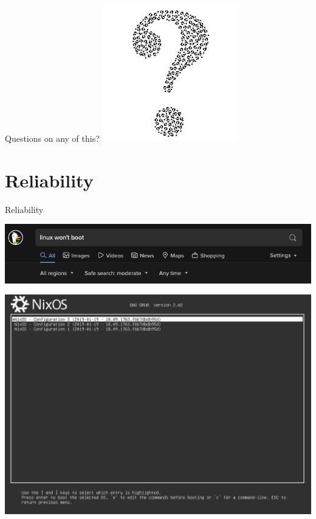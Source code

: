 \documentclass{beamer}
\begin{document}
\begin{frame}
    \centering
    Questions on any of this?
    \includegraphics{../resources/question-2.png}
\end{frame}

\section{Reliability}

\begin{frame}
    \centering
    Reliability
\end{frame}

\begin{frame}
    \centering
    \includegraphics[width=\textheight,keepaspectratio]{../resources/linux-wont-boot.png}
\end{frame}

\begin{frame}
    \centering
    \includegraphics[width=\textheight,keepaspectratio]{../resources/nix-grub-bios.jpg}
\end{frame}
\end{document}

